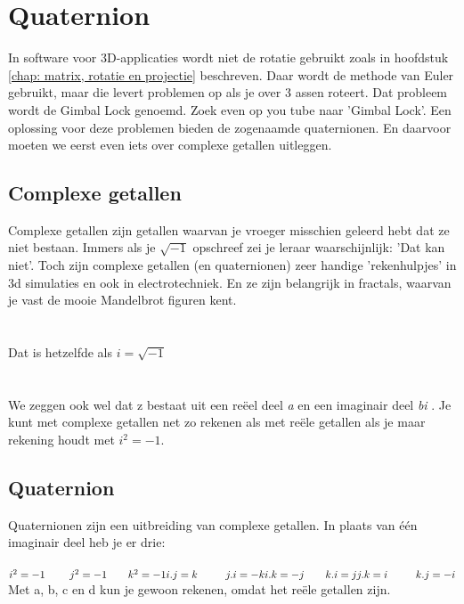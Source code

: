 \chapter{Quaternion}
\label{chap: Quaternion}
In software voor 3D-applicaties wordt niet de rotatie gebruikt zoals in hoofdstuk \ref{chap: matrix, rotatie en projectie} beschreven. Daar wordt de methode van Euler gebruikt, maar die levert problemen op als je over 3 assen roteert. Dat probleem wordt de Gimbal Lock genoemd. Zoek even op you tube naar 'Gimbal Lock'. 
Een oplossing voor deze problemen bieden de zogenaamde quaternionen. En daarvoor moeten we eerst even iets over complexe getallen uitleggen.
\section{Complexe getallen}
Complexe getallen zijn getallen waarvan je vroeger misschien geleerd hebt dat ze niet bestaan. Immers als je $ \sqrt{-1} $ opschreef zei je leraar waarschijnlijk: 'Dat kan niet'. Toch zijn complexe getallen (en quaternionen) zeer handige 'rekenhulpjes' in 3d simulaties en ook in electrotechniek. En ze zijn belangrijk in fractals, waarvan je vast de mooie Mandelbrot figuren kent. \\ \\
\\
Dat is hetzelfde als $ i =\sqrt{-1} $ \\ \\
\\
We zeggen ook wel dat z bestaat uit een reëel deel \textit{a} en een imaginair deel \textit{bi} .  Je kunt met complexe getallen net zo rekenen als met reële getallen als je maar rekening houdt met $  i^2 = -1.$
\section{Quaternion}
Quaternionen zijn een uitbreiding van complexe getallen. In plaats van één imaginair deel heb je er drie:\\ \\
$ i^2 = -1 \qquad  \ j^2 = -1 \qquad k^2 = -1   \\
i.j = k \qquad \ \ j.i = -k \\
i.k = -j \qquad k.i = j \\
j.k = i \qquad \ \ k.j = -i \\ $
Met a, b, c en d kun je gewoon rekenen, omdat het reële getallen zijn.\\ \\
